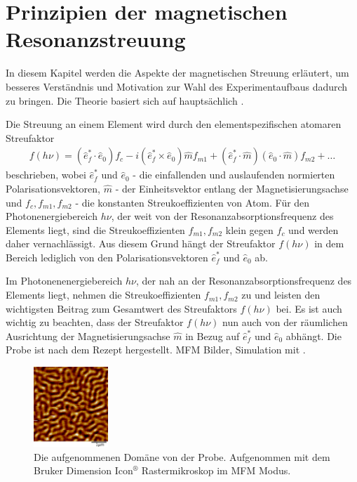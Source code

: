 \chapter{Prinzipien der magnetischen Resonanzstreuung}
\label{text:streuung}
In diesem Kapitel werden die Aspekte der magnetischen Streuung erläutert, um besseres Verständnis und Motivation zur Wahl des Experimentaufbaus dadurch zu bringen. Die Theorie basiert sich auf hauptsächlich \cite{kortright_resonant_2013}. 


\noindent
Die Streuung an einem Element wird durch den elementspezifischen atomaren Streufaktor
\begin{align}
f(h\nu) = (\hat{e}_f^* \cdot \hat{e}_0)f_c - i(\hat{e}_f^* \times \hat{e}_0)\hat{m}f_{m1}+(\hat{e}_f^* \cdot \hat{m})(\hat{e}_0\cdot\hat{m})f_{m2} + \dots
\end{align}
beschrieben, wobei $\hat{e}_f^*$ und $\hat{e}_0$ - die einfallenden und auslaufenden normierten Polarisationsvektoren, $\hat{m}$ - der Einheitsvektor entlang der Magnetisierungsachse und $f_c, f_{m1}, f_{m2}$ - die konstanten Streukoeffizienten von Atom. Für den Photonenergiebereich $h\nu$, der weit von der Resonanzabsorptionsfrequenz des Elements liegt, sind die Streukoeffizienten  $f_{m1}, f_{m2}$ klein gegen $f_c$ und werden daher vernachlässigt. Aus diesem Grund hängt der Streufaktor $f(h\nu)$ in dem Bereich lediglich von den Polarisationsvektoren $\hat{e}_f^*$ und $\hat{e}_0$ ab.

\noindent
Im Photonenenergiebereich $h\nu$, der nah an der Resonanzabsorptionsfrequenz des Elements liegt, nehmen die Streukoeffizienten $f_{m1}, f_{m2}$ zu und leisten den wichtigsten Beitrag zum Gesamtwert des Streufaktors $f(h\nu)$ bei. Es ist auch wichtig zu beachten, dass der Streufaktor $f(h\nu)$ nun auch von der räumlichen Ausrichtung der Magnetisierungsachse $\hat{m}$ in Bezug auf $\hat{e}_f^*$ und $\hat{e}_0$ abhängt.
Die Probe ist nach dem Rezept \cite{tripathi_dichroic_2011} hergestellt. MFM Bilder, Simulation mit \cite{schick_udkm1dsim_2021}.
\begin{figure}[h]
    \centering
    \includegraphics[width=0.25\textwidth]{images/ds220126_R1_membrane_amplitude_cropped.png}
    \caption{Die aufgenommenen Domäne von der Probe. Aufgenommen mit dem Bruker Dimension Icon$^{\text{®}}$ Rastermikroskop im MFM Modus.}
    \label{fig:mfm_amplitude}
\end{figure}

\newpage